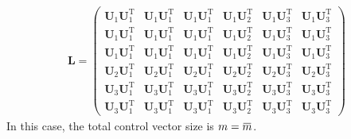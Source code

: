 \documentclass[12pt]{scrartcl}
\newcommand{\overbar}[1]{\mkern 1.5mu\overline{\mkern-1.5mu#1\mkern-1.5mu}\mkern 1.5mu}
\begin{document}
\begin{align}
\mathbf{L} = \left( \begin{array}{ccc|c|cc}
\mathbf{U}_1 \mathbf{U}_1^\mathrm{T} & \mathbf{U}_1 \mathbf{U}_1^\mathrm{T} & \mathbf{U}_1 \mathbf{U}_1^\mathrm{T} & \mathbf{U}_1 \mathbf{U}_2^\mathrm{T} & \mathbf{U}_1 \mathbf{U}_3^\mathrm{T} & \mathbf{U}_1 \mathbf{U}_3^\mathrm{T} \\
\mathbf{U}_1 \mathbf{U}_1^\mathrm{T} & \mathbf{U}_1 \mathbf{U}_1^\mathrm{T} & \mathbf{U}_1 \mathbf{U}_1^\mathrm{T} & \mathbf{U}_1 \mathbf{U}_2^\mathrm{T} & \mathbf{U}_1 \mathbf{U}_3^\mathrm{T} & \mathbf{U}_1 \mathbf{U}_3^\mathrm{T} \\
\mathbf{U}_1 \mathbf{U}_1^\mathrm{T} & \mathbf{U}_1 \mathbf{U}_1^\mathrm{T} & \mathbf{U}_1 \mathbf{U}_1^\mathrm{T} & \mathbf{U}_1 \mathbf{U}_2^\mathrm{T} & \mathbf{U}_1 \mathbf{U}_3^\mathrm{T} & \mathbf{U}_1 \mathbf{U}_3^\mathrm{T} \\[0.3ex]
\hline
\mathbf{U}_2 \mathbf{U}_1^\mathrm{T} & \mathbf{U}_2 \mathbf{U}_1^\mathrm{T} & \mathbf{U}_2 \mathbf{U}_1^\mathrm{T} & \mathbf{U}_2 \mathbf{U}_2^\mathrm{T} & \mathbf{U}_2 \mathbf{U}_3^\mathrm{T} & \mathbf{U}_2 \mathbf{U}_3^\mathrm{T} \\[0.3ex]
\hline
\mathbf{U}_3 \mathbf{U}_1^\mathrm{T} & \mathbf{U}_3 \mathbf{U}_1^\mathrm{T} & \mathbf{U}_3 \mathbf{U}_1^\mathrm{T} & \mathbf{U}_3 \mathbf{U}_2^\mathrm{T} & \mathbf{U}_3 \mathbf{U}_3^\mathrm{T} & \mathbf{U}_3 \mathbf{U}_3^\mathrm{T} \\
\mathbf{U}_3 \mathbf{U}_1^\mathrm{T} & \mathbf{U}_3 \mathbf{U}_1^\mathrm{T} & \mathbf{U}_3 \mathbf{U}_1^\mathrm{T} & \mathbf{U}_3 \mathbf{U}_2^\mathrm{T} & \mathbf{U}_3 \mathbf{U}_3^\mathrm{T} & \mathbf{U}_3 \mathbf{U}_3^\mathrm{T}
\end{array} \right)
\end{align}
In this case, the total control vector size is $\displaystyle m = \overbar{m}$.\\
\end{document}
